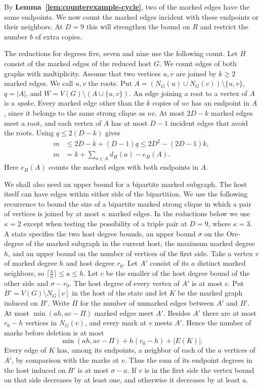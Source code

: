 \documentclass[preprint,11pt,numbers]{elsarticle-arxiv}
\numberwithin{equation}{section}
\theoremstyle{definition}
\begin{document}
By \textbf{Lemma~\ref{lem:counterexample-cycle}}, two of the marked
edges have the same endpoints. We now count the marked edges incident
with these endpoints or their neighbors. At $D=9$ this will strengthen
the bound on $R$ and restrict the number $b$ of extra copies.

The reductions for degrees five, seven and nine use the following count. Let $H$ consist of the marked edges of the reduced host $G$.
We count edges of both graphs with multiplicity. Assume that two
vertices $u,v$ are joined by $k\geq2$ marked edges. We call $u,v$
the roots. Put $A=(N_G(u)\cup N_G(v))\setminus\{u,v\}$,
$q=|A|$, and $W=V(G)\setminus(A\cup\{u,v\})$. An edge
joining a root to a vertex of $A$ is a \emph{spoke}. Every
marked edge other than the $k$ copies of $uv$ has an endpoint
in $A$, since it belongs to the same strong clique as $uv$.
At most $2D-k$ marked edges meet a root, and each vertex of
$A$ has at most $D-1$ incident edges that avoid the roots.
Using $q\le 2(D-k)$ gives
\begin{equation}\label{eq:multi-root-pair-budget}
\begin{aligned}
 m&\le 2D-k+(D-1)q\le 2D^2-(2D-1)k,\\
 m&=k+\sum_{a\in A}d_H(a)-e_H(A).
\end{aligned}
\end{equation}
Here $e_H(A)$ counts the marked edges with both endpoints in $A$.

We shall also need an upper bound for a bipartite marked subgraph.
The host itself can have edges within either side of the bipartition.
We use the following recurrence to bound the size of a
bipartite marked strong clique in which a pair of vertices is joined
by at most $\kappa$ marked edges. In the reductions below we use
$\kappa=2$ except when testing the possibility of a triple pair at
$D=9$, where $\kappa=3$. A state specifies the two host degree bounds,
an upper bound $\sigma$ on the Ore-degree of the marked subgraph
in the current host, the maximum
marked degree $h$, and an upper bound on the number of
vertices of the first side. Take a vertex $v$ of marked
degree $h$ and host degree $r_0$. Let $A'$ consist of its
$a$ distinct marked neighbors, so $\lceil\frac{h}{\kappa}\rceil\le a\le h$.
Let $c$ be the smaller of the host degree bound of the other
side and $\sigma-r_0$. The host degree of every vertex of
$A'$ is at most $c$. Put $B'=V(G)\setminus N_G[v]$ in the
host of the state and let $K$ be the marked graph induced on
$B'$. Write $\Pi$ for the number of unmarked edges between
$A'$ and $B'$. At most $\min(ah,ac-\Pi)$ marked edges
meet $A'$. Besides $A'$ there are at most $r_0-h$ vertices
in $N_G(v)$, and every mark at $v$ meets $A'$. Hence the
number of marks before deletion is at most
\begin{equation}\label{eq:finite-bipartite-root-count}
 \min(ah,ac-\Pi)+h(r_0-h)+|E(K)|.
\end{equation}
Every edge of $K$ has, among its endpoints, a neighbor of
each of the $a$ vertices of $A'$, by comparison with the
marks at $v$. Thus the sum of its endpoint degrees in the host
induced on $B'$ is at most $\sigma-a$. If $v$ is in the first side
the vertex bound on that side decreases by at least one,
and otherwise it decreases by at least $a$.
\end{document}
